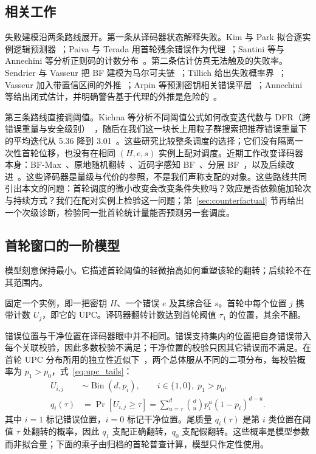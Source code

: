 \documentclass[UTF8,a4paper,10pt,twocolumn]{ctexart}
\begin{document}
\subsection{相关工作}

失败建模沿两条路线展开。第一条从译码器状态解释失败。Kim 与 Park 拟合逐实例逻辑预测器~\cite{kim2021logistic}；Paiva 与 Terada 用首轮残余错误作为代理~\cite{paiva2022pickyfix}；Santini 等与 Annechini 等分析正则码的计数分布~\cite{santini2019conservative,santini2020analysis,annechini2024estimation}。第二条估计仿真无法触及的失败率。Sendrier 与 Vasseur 把 BF 建模为马尔可夫链~\cite{sendrier2019dfr,sendrier2020lowdfr}；Tillich 给出失败概率界~\cite{tillich2018dfp}；Vasseur 加入带置信区间的外推~\cite{vasseur2021thesis}；Arpin 等预测密钥相关错误平层~\cite{arpin2025errorfloor}；Annechini 等给出闭式估计，并明确警告基于代理的外推是危险的~\cite{annechini2025closedform}。

第三条路线直接调阈值。Kichna 等分析不同阈值公式如何改变迭代数与 DFR（跨错误重量与安全级别）~\cite{kichna2024thresholds}，随后在我们这一块长上用粒子群搜索把推荐错误重量下的平均迭代从 5.36 降到 3.01~\cite{kichna2025pso}。这些研究比较整条调度的选择；它们没有隔离一次性首轮位移，也没有在相同 $(H,e,s)$ 实例上配对调度。近期工作改变译码器本身：BF-Max~\cite{baldelli2025bfmax}、原地随机翻转~\cite{baldi2021inplace}、近码字感知 BF~\cite{baldelli2026ncw}、分层 BF~\cite{cai2025layered}，以及后续改进~\cite{santini2026flip}。这些译码器是量级与代价的参照，不是我们声称支配的对象。这些路线共同引出本文的问题：首轮调度的微小改变会改变条件失败吗？效应是否依赖施加轮次与持续方式？我们在配对实例上检验这一问题；第~\ref{sec:counterfactual} 节再给出一个次级诊断，检验同一批首轮统计量能否预测另一套调度。
\subsection{首轮窗口的一阶模型}\label{sec:model}

模型刻意保持最小。它描述首轮阈值的轻微抬高如何重塑该轮的翻转；后续轮不在其范围内。

固定一个实例，即一把密钥 $H$、一个错误 $e$ 及其综合征 $s$。首轮中每个位置 $j$ 携带计数 $U_j$，即它的 UPC。译码器翻转计数达到首轮阈值 $\tau_1$ 的位置，其余不翻。

错误位置与干净位置在译码器眼中并不相同。错误支持集内的位置把自身错误带入每个关联校验，因此多数校验不满足；干净位置的校验只因其它错误而不满足。在首轮 UPC 分布所用的独立性近似下~\cite{annechini2024estimation}，两个总体服从不同的二项分布，每校验概率为 $p_1>p_0$，式~\eqref{eq:upc_tails}：
\begin{equation}\label{eq:upc_tails}
\begin{aligned}
U_{i,j} &\sim \operatorname{Bin}(d,p_i), \qquad i\in\{1,0\},\; p_1>p_0,\\
q_i(\tau) &= \Pr[U_{i,j}\ge\tau]
= \textstyle\sum_{u=\tau}^{d}\binom{d}{u}p_i^{u}(1-p_i)^{d-u}.
\end{aligned}
\end{equation}
其中 $i=1$ 标记错误位置，$i=0$ 标记干净位置。尾质量 $q_i(\tau)$ 是第 $i$ 类位置在阈值 $\tau$ 处翻转的概率，因此 $q_1$ 支配正确翻转，$q_0$ 支配假翻转。这些概率是模型参数而非拟合量；下面的乘子由归档的首轮普查计算，模型只作定性使用。
\end{document}

